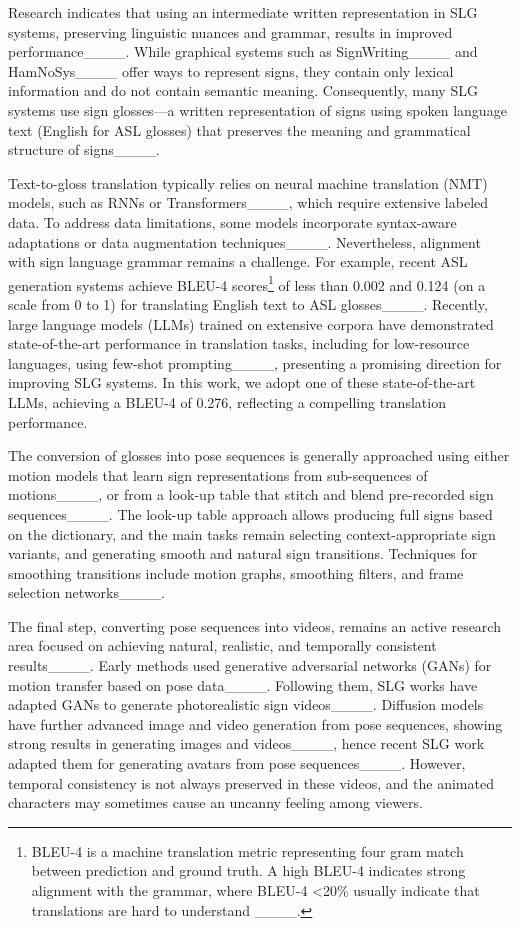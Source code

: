 Research indicates that using an intermediate written representation in SLG systems, preserving linguistic nuances and grammar, results in improved performance____. While graphical systems such as SignWriting____ and HamNoSys____ offer ways to represent signs, they contain only lexical information and do not contain semantic meaning. Consequently, many SLG systems use sign glosses---a written representation of signs using spoken language text (\eg English for ASL glosses) that preserves the meaning and grammatical structure of signs____. 

Text-to-gloss translation typically relies on neural machine translation (NMT) models, such as RNNs or Transformers____, which require extensive labeled data. To address data limitations, some models incorporate syntax-aware adaptations or data augmentation techniques____. Nevertheless, alignment with sign language grammar remains a challenge. For example, recent ASL generation systems achieve BLEU-4 scores\footnote{ BLEU-4 is a machine translation metric representing four gram match between prediction and ground truth. A high BLEU-4 indicates strong alignment with the grammar, where BLEU-4 <20\% usually indicate that translations are hard to understand ____.} of less than 0.002 and 0.124 (on a scale from 0 to 1) for translating English text to ASL glosses____. Recently, large language models (LLMs) trained on extensive corpora have demonstrated state-of-the-art performance in translation tasks, including for low-resource languages, using few-shot prompting____, presenting a promising direction for improving SLG systems. In this work, we adopt one of these state-of-the-art LLMs, achieving a BLEU-4 of 0.276, reflecting a compelling translation performance.

The conversion of glosses into pose sequences is generally approached using either motion models that learn sign representations from sub-sequences of motions____, or from a look-up table that stitch and blend pre-recorded sign sequences____. The look-up table approach allows producing full signs based on the dictionary, and the main tasks remain selecting context-appropriate sign variants, and generating smooth and natural sign transitions. Techniques for smoothing transitions include motion graphs, smoothing filters, and frame selection networks____. 

The final step, converting pose sequences into videos, remains an active research area focused on achieving natural, realistic, and temporally consistent results____. Early methods used generative adversarial networks (GANs) for motion transfer based on pose data____. Following them, SLG works have adapted GANs to generate photorealistic sign videos____. Diffusion models have further advanced image and video generation from pose sequences, showing strong results in generating images and videos____, hence recent SLG work adapted them for generating avatars from pose sequences____. However, temporal consistency is not always preserved in these videos, and the animated characters may sometimes cause an uncanny feeling among viewers.

